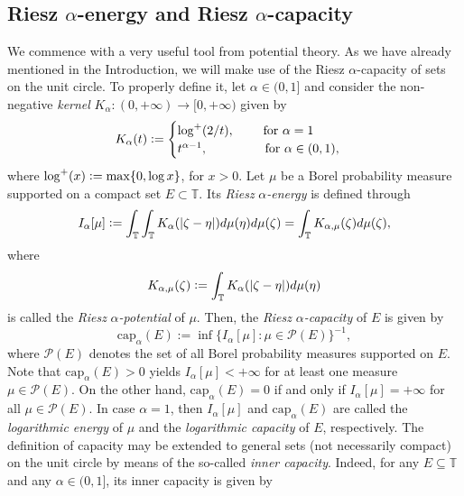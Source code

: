 \documentclass[12pt]{amsart}
\theoremstyle{definition}\newtheorem{remark}[theorem]{Remark}
\theoremstyle{definition}\newtheorem{example}[theorem]{Example}
\theoremstyle{definition}\newtheorem{definition}{Definition}
\numberwithin{equation}{section}
\newcommand\TT{{\mathbb T}}
\begin{document}
\subsection{Riesz $\alpha$-energy and Riesz $\alpha$-capacity}
We commence with a very useful tool from potential theory. As we have already mentioned in the Introduction, we will make use of the Riesz $\alpha$-capacity of sets on the unit circle. To properly define it, let $\alpha\in(0,1]$ and consider the non-negative \textit{kernel} $K_\alpha:(0,+\infty)\rightarrow [0,+\infty)$ given by
\begin{equation}\label{eq:kernel}
K_\alpha(t)\vcentcolon=
\begin{cases}
    \log^+(2/t), \quad\quad\hspace{0.1cm}\text{for }\alpha=1\\
    t^{\alpha-1}, \quad\quad\quad\quad\hspace{0.2cm}\text{for } \alpha\in (0,1),
\end{cases}
\end{equation}
where $\log^+(x)\vcentcolon=\max\{0,\log x\}$, for $x>0$. Let $\mu$ be a Borel probability measure supported on a compact set $E\subset \TT$. Its \textit{Riesz} $\alpha$\textit{-energy} is defined through
\begin{equation}\label{eq:energy}
I_\alpha[\mu]\vcentcolon=\int_{\TT}\int_{\TT}K_\alpha(|\zeta-\eta|)d\mu(\eta)d\mu(\zeta)=\int_{\TT}K_{\alpha,\mu}(\zeta)d\mu(\zeta),
\end{equation}
where
\begin{equation}\label{eq:potential}
    K_{\alpha,\mu}(\zeta)\vcentcolon=\int_{\TT}K_\alpha(|\zeta-\eta|)d\mu(\eta)
\end{equation}
is called the \textit{Riesz} $\alpha$\textit{-potential} of $\mu$. Then, the \textit{Riesz} $\alpha$\textit{-capacity} of $E$ is given by
\begin{equation*}
\mathrm{cap}_{\alpha}(E):=\inf\{I_\alpha[\mu]:\mu\in \mathcal{P}(E)\}^{-1},
\end{equation*}
where $\mathcal{P}(E)$ denotes the set of all Borel probability measures supported on $E$. Note that $\mathrm{cap}_\alpha(E)>0$ yields $I_\alpha[\mu]<+\infty$ for at least one measure $\mu\in \mathcal{P}(E)$. On the other hand, $\mathrm{cap}_\alpha(E)=0$ if and only if  $I_\alpha[\mu]=+\infty$ for all $\mu\in \mathcal{P}(E)$. In case $\alpha=1$, then $I_\alpha[\mu]$ and $\mathrm{cap}_\alpha(E)$ are called the \textit{logarithmic energy} of $\mu$ and the \textit{logarithmic capacity} of $E$, respectively. The definition of capacity may be extended to general sets (not necessarily compact) on the unit circle by means of the so-called \textit{inner capacity}. Indeed, for any $E\subseteq\TT$ and any $\alpha\in(0,1]$, its inner capacity is given by
\end{document}
